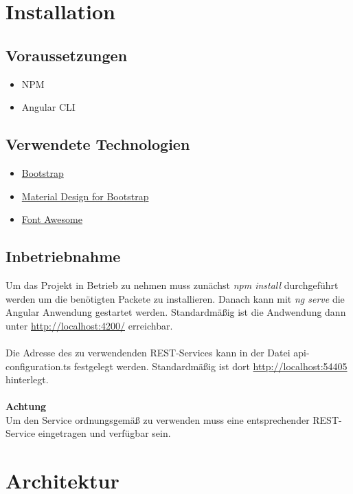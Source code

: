 \documentclass[10pt,a4paper,margin=0pt]{scrartcl}
\begin{document}
\fontsize{10pt}{24pt}\selectfont

\section{Installation}
\subsection{Voraussetzungen}
\begin{itemize}
	\item NPM
	\item Angular CLI
\end{itemize}
\subsection{Verwendete Technologien}
\begin{itemize}
	\item \href{https://getbootstrap.com/}{Bootstrap}
	\item \href{https://mdbootstrap.com/docs/angular/>}{Material Design for Bootstrap}
	\item \href{https://fontawesome.com//}{Font Awesome}
\end{itemize}
\subsection{Inbetriebnahme}
Um das Projekt in Betrieb zu nehmen muss zunächst \textit{npm install} durchgeführt werden um die benötigten Packete zu installieren. Danach kann mit \textit{ng serve} die Angular Anwendung gestartet werden. Standardmäßig ist die Andwendung dann unter \url{http://localhost:4200/} erreichbar.\\\\
Die Adresse des zu verwendenden REST-Services kann in der Datei api-configuration.ts festgelegt werden. Standardmäßig ist dort \url{http://localhost:54405} hinterlegt.\\\\
\textbf{Achtung}\\
Um den Service ordnungsgemäß zu verwenden muss eine entsprechender REST-Service eingetragen und verfügbar sein.
\pagebreak
\section{Architektur}
\end{document}
